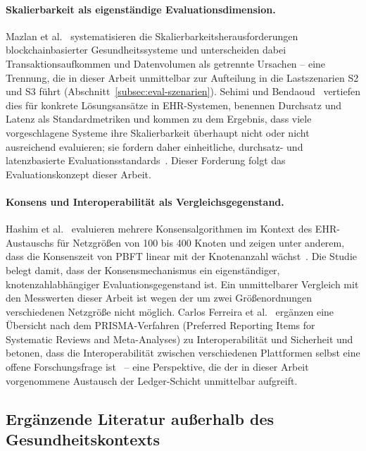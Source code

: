 \paragraph{Skalierbarkeit als eigenständige Evaluationsdimension.} Mazlan et al.~\cite{mazlan2020} systematisieren die Skalierbarkeitsherausforderungen blockchainbasierter Gesundheitssysteme und unterscheiden dabei Transaktionsaufkommen und Datenvolumen als getrennte Ursachen -- eine Trennung, die in dieser Arbeit unmittelbar zur Aufteilung in die Lastszenarien S2 und S3 führt (Abschnitt~\ref{subsec:eval-szenarien}). Sehimi und Bendaoud~\cite{sehimibendaoud2023} vertiefen dies für konkrete Lösungsansätze in EHR-Systemen, benennen Durchsatz und Latenz als Standardmetriken und kommen zu dem Ergebnis, dass viele vorgeschlagene Systeme ihre Skalierbarkeit überhaupt nicht oder nicht ausreichend evaluieren; sie fordern daher einheitliche, durchsatz- und latenzbasierte Evaluationsstandards~\cite{sehimibendaoud2023}. Dieser Forderung folgt das Evaluationskonzept dieser Arbeit.

\paragraph{Konsens und Interoperabilität als Vergleichsgegenstand.} Hashim et al.~\cite{hashim2021} evaluieren mehrere Konsensalgorithmen im Kontext des EHR-Austauschs für Netzgrößen von 100 bis 400 Knoten und zeigen unter anderem, dass die Konsenszeit von PBFT linear mit der Knotenanzahl wächst~\cite{hashim2021}. Die Studie belegt damit, dass der Konsensmechanismus ein eigenständiger, knotenzahlabhängiger Evaluationsgegenstand ist. Ein unmittelbarer Vergleich mit den Messwerten dieser Arbeit ist wegen der um zwei Größenordnungen verschiedenen Netzgröße nicht möglich. Carlos Ferreira et al.~\cite{ferreira2024} ergänzen eine Übersicht nach dem PRISMA-Verfahren (Preferred Reporting Items for Systematic Reviews and Meta-Analyses) zu Interoperabilität und Sicherheit und betonen, dass die Interoperabilität zwischen verschiedenen Plattformen selbst eine offene Forschungsfrage ist~\cite{ferreira2024} -- eine Perspektive, die der in dieser Arbeit vorgenommene Austausch der Ledger-Schicht unmittelbar aufgreift.

\subsection{Ergänzende Literatur außerhalb des Gesundheitskontexts}
\label{sec:literatur_ergaenzend}

